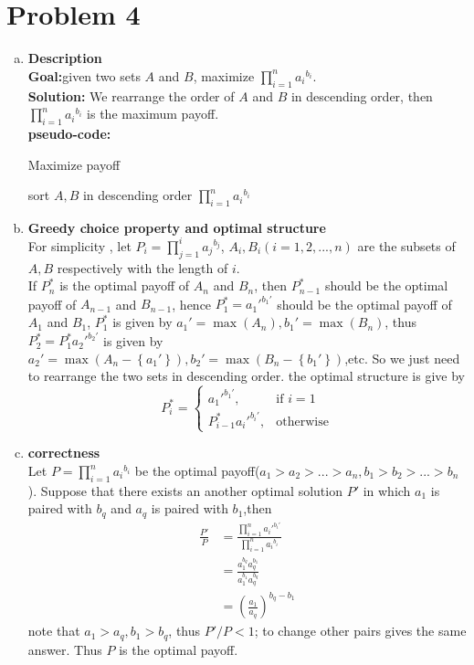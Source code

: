\section{Problem 4}
\begin{enumerate}[a).]
	\item \textbf{Description}	\\
	\textbf{Goal:}\qquad given two sets $A$ and $B$, maximize $\prod_{i=1}^{n}{a_i}^{b_i}$. \\
	\textbf{Solution:} We rearrange the order of $A$ and $B$ in descending order,
	then $\prod_{i=1}^{n}{a_i}^{b_i}$ is the maximum payoff. \\
	\textbf{pseudo-code:} 
	\begin{algorithm}[H]
		\caption{Maximize payoff}
		\begin{algorithmic}[1]
			 \State sort $A,B$ in descending order
			 \State \Return $\prod_{i=1}^{n}{a_i}^{b_i}$
			\EndFunction 
		\end{algorithmic} 
	\end{algorithm}
	\item \textbf{Greedy choice property and optimal structure} \\
	For simplicity , let $P_i = \prod_{j=1}^{i}{a_j}^{b_j}$, 
	$A_i ,B_i (i = 1,2,...,n)$ are the subsets of $A,B$ respectively with the length of $i$.	\\
	 If $P_n^*$ is the optimal payoff of $A_n$ and $B_n$,
	then $P_{n-1}^*$ should be the optimal payoff of $A_{n-1} $ 
	and $B_{n-1}  $,
	hence $P_1^* = a_1'^{b_1'}$ should be the optimal payoff of $A_1$ and $B_1$,
	$P_1^*$ is given by $ a_1' = \max(A_n), b_1' = \max(B_n)$,
	thus $P_2^* = P_1^* a_2'^{b_2'}$ is given by 
	$a_2' = \max(A_n - \left\lbrace{a_1'}\right\rbrace), b_2' = \max(B_n - \left\lbrace{b_1'}\right\rbrace)$,etc.
	So we just need to rearrange the two sets in descending order.
	the optimal structure is give by
	\[
		P_i^* = \left\lbrace \begin{split} 
		 a_1'^{b_1'}, & \text{if } i = 1\\
		 P_{i-1}^* a_{i}'^{b_i'}, &\text{otherwise} 
		\end{split} \right. 
	\]
	\item \textbf{correctness} \\
		Let $P = \prod_{i=1}^{n} {a_i}^{b_i}$ be the optimal payoff($a_1>a_2>...>a_n, b_1>b_2>...>b_n$).
		Suppose that there exists an another optimal solution $P'$
		 in which $a_1$ is paired with $b_q$ and $a_q$ is paired with $b_1$,then
		 \[ \begin{split} 
			 \frac{P'}{P} &= \frac{\prod_{i=1}^n {a_i'}^{b_i'}}{\prod_{i=1}^n {a_i}^{b_i}} \\
			 &=  \frac{ a_1^{b_q} a_q^{b_1}} {a_1^{b_1} a_q^{b_q}} \\
			 &= (\frac{a_1}{a_q})^{b_q - b_1}
			\end{split}  
		 \]
	 note that $a_1 > a_q, b_1 > b_q$, thus $P'/P < 1$; to change other pairs gives the  same answer.
	 Thus $P$ is the optimal payoff.
	 		

\end{enumerate}
